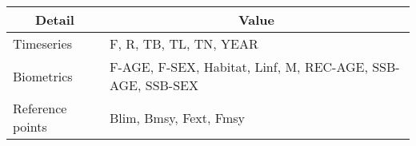 \begin{table}[htb]
\centering
\begin{tabular}{lp{7cm}}
\toprule
\multicolumn{1}{c}{\textbf{Detail}} & \multicolumn{1}{c}{\textbf{Value}} \\
\midrule
Timeseries       & F, R, TB, TL, TN, YEAR                                    \\
Biometrics       & F-AGE, F-SEX, Habitat, Linf, M, REC-AGE, SSB-AGE, SSB-SEX \\
Reference points & Blim, Bmsy, Fext, Fmsy                                    \\
\bottomrule
\end{tabular}
\label{tab:timebiodet}
\end{table}
